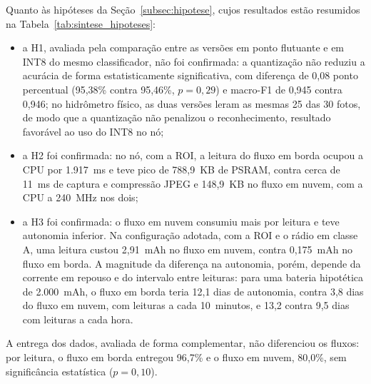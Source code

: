 Quanto às hipóteses da Seção~\ref{subsec:hipotese}, cujos resultados estão resumidos na
Tabela~\ref{tab:sintese_hipoteses}:

\begin{itemize}
    \item a H1, avaliada pela comparação entre as versões em ponto flutuante e em INT8 do
    mesmo classificador, não foi confirmada: a quantização não reduziu a acurácia de
    forma estatisticamente significativa, com diferença de 0,08 ponto percentual
    (95,38\% contra 95,46\%, $p = 0{,}29$) e macro-F1 de 0,945 contra 0,946; no hidrômetro físico, as duas
    versões leram as mesmas 25 das 30 fotos, de
    modo que a quantização não penalizou o reconhecimento, resultado favorável ao uso do
    INT8 no nó;
    \item a H2 foi confirmada: no nó, com a ROI, a leitura do fluxo em borda ocupou a CPU
    por 1.917~ms e teve pico de 788,9~KB de PSRAM, contra cerca de 11~ms de captura e
    compressão JPEG e 148,9~KB no fluxo em nuvem, com a CPU a 240~MHz nos dois;
    \item a H3 foi confirmada: o fluxo em nuvem consumiu mais por leitura
    e teve autonomia inferior. Na configuração adotada, com a ROI e o rádio em classe A, uma
    leitura custou 2,91~mAh no fluxo em nuvem, contra 0,175~mAh no fluxo em borda. A magnitude
    da diferença na autonomia, porém, depende da corrente em repouso e do intervalo entre
    leituras: para uma bateria hipotética de 2.000~mAh, o fluxo em borda teria 12,1 dias de
    autonomia, contra 3,8 dias do fluxo em nuvem, com leituras a cada 10~minutos, e 13,2
    contra 9,5 dias com leituras a cada hora.
\end{itemize}

A entrega dos dados, avaliada de forma complementar, não diferenciou os fluxos: por leitura,
o fluxo em borda entregou 96,7\% e o fluxo em nuvem, 80,0\%, sem significância estatística
($p = 0{,}10$).
